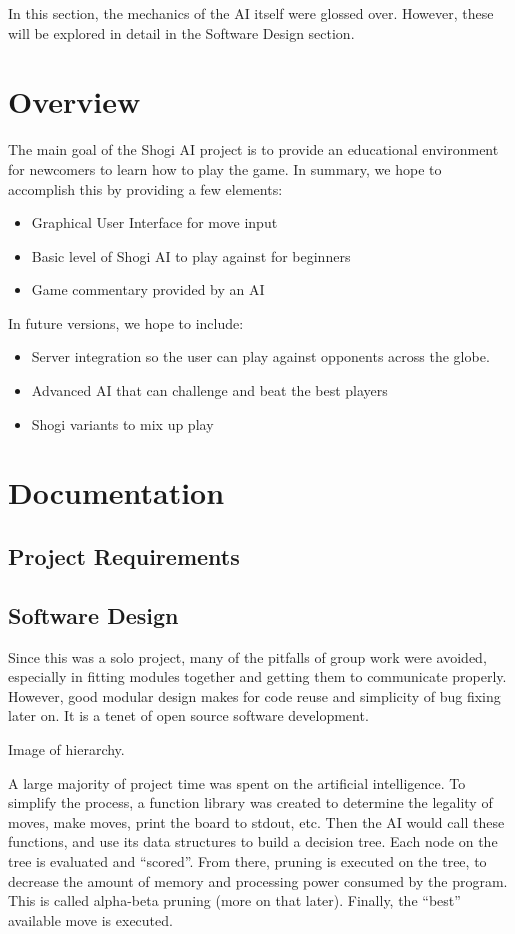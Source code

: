 \documentclass[letterpaper,12pt]{article}
\begin{document}
In this section, the mechanics of the AI itself were glossed over. However, these will be explored in detail in the Software Design section.

\section{Overview}
The main goal of the Shogi AI project is to provide an educational environment for newcomers to learn how to play the game. In summary, we hope to accomplish this by providing a few elements:
\begin{itemize}
 \item Graphical User Interface for move input
 \item Basic level of Shogi AI to play against for beginners
 \item Game commentary provided by an AI
\end{itemize}
In future versions, we hope to include:
\begin{itemize}
 \item Server integration so the user can play against opponents across the globe.
 \item Advanced AI that can challenge and beat the best players
 \item Shogi variants to mix up play
\end{itemize}

\newpage

\section{Documentation}

\subsection{Project Requirements}

\subsection{Software Design}

Since this was a solo project, many of the pitfalls of group work were avoided, especially in fitting modules together and getting them to communicate properly. However, good modular design makes for code reuse and simplicity of bug fixing later on. It is a tenet of open source software development.

Image of hierarchy.

A large majority of project time was spent on the artificial intelligence. To simplify the process, a function library was created to determine the legality of moves, make moves, print the board to stdout, etc. Then the AI would call these functions, and use its data structures to build a decision tree. Each node on the tree is evaluated and ``scored''. From there, pruning is executed on the tree, to decrease the amount of memory and processing power consumed by the program. This is called alpha-beta pruning (more on that later). Finally, the ``best'' available move is executed.
\end{document}
